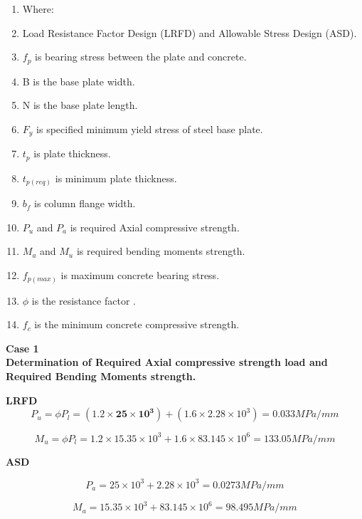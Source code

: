 {\begin{enumerate}[label={}]
\item {Where:}
\item Load Resistance Factor Design (LRFD) and Allowable Stress Design (ASD).
\item \(f_{p}\) is bearing stress between the plate and concrete.
 \item B is the base plate width.
 \item N is the base plate length.
\item \(F_{y}\) is specified minimum yield stress of steel base plate.
 \item \({t}_{p}\) is plate thickness.
 \item \({t}_{{p}({req})}\) is minimum plate thickness.
 \item \({b}_{f}\) is column flange width.
\item \(P_u\) and \(P_a\)  is required Axial compressive strength.
\item \(M_a\)  and \(M_u\)  is required bending moments strength.
\item  \({f}_{{p}({max})}\) is maximum concrete bearing stress.
\item   \( \phi\)  is the resistance factor .
\item  \( f_c \) is the minimum concrete compressive strength.
\end{enumerate}


\textbf{Case 1}\\

\textbf{ Determination of Required Axial compressive strength load and Required Bending Moments strength.}

\textbf{LRFD}
\begin{equation}
{P}_{u} = \phi P_l = (1.2 \times\mathbf{25}\times{\mathbf{10}}^\mathbf{3}) + (1.6 \times 2.28 \times 10^3) = 0.033 MPa/mm
\end{equation}



\begin{equation}
    {M}_{u}=  \phi P_l = 1.2 \times {15}.{35}\times{10}^{3} +  1.6 \times 83.145 \times 10^6 = 133.05MPa/mm
\end{equation}


\textbf{ ASD}

\begin{equation}
{P}_{a} = 25\times{{10}}^{3} + 2.28 \times 10^3
 = 0.0273MPa/mm
\end{equation}


\begin{equation}
{M}_{a}= 15.35\times 10^3 + 83.145 \times 10^6 = 98.495MPa/mm
\end{equation}



}

